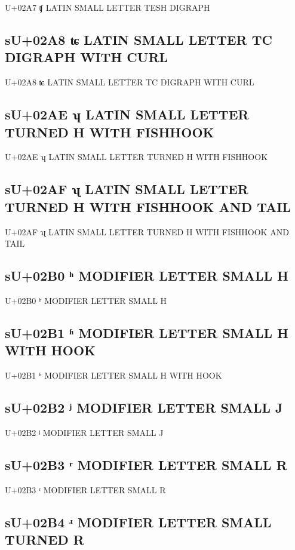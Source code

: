 U+02A7 ʧ LATIN SMALL LETTER TESH DIGRAPH

\subsection{sU+02A8 ʨ LATIN SMALL LETTER TC DIGRAPH WITH CURL}

U+02A8 ʨ LATIN SMALL LETTER TC DIGRAPH WITH CURL

\subsection{sU+02AE ʮ LATIN SMALL LETTER TURNED H WITH FISHHOOK}

U+02AE ʮ LATIN SMALL LETTER TURNED H WITH FISHHOOK

\subsection{sU+02AF ʯ LATIN SMALL LETTER TURNED H WITH FISHHOOK AND TAIL}

U+02AF ʯ LATIN SMALL LETTER TURNED H WITH FISHHOOK AND TAIL

\subsection{sU+02B0 ʰ MODIFIER LETTER SMALL H}

U+02B0 ʰ MODIFIER LETTER SMALL H

\subsection{sU+02B1 ʱ MODIFIER LETTER SMALL H WITH HOOK}

U+02B1 ʱ MODIFIER LETTER SMALL H WITH HOOK

\subsection{sU+02B2 ʲ MODIFIER LETTER SMALL J}

U+02B2 ʲ MODIFIER LETTER SMALL J

\subsection{sU+02B3 ʳ MODIFIER LETTER SMALL R}

U+02B3 ʳ MODIFIER LETTER SMALL R

\subsection{sU+02B4 ʴ MODIFIER LETTER SMALL TURNED R}

